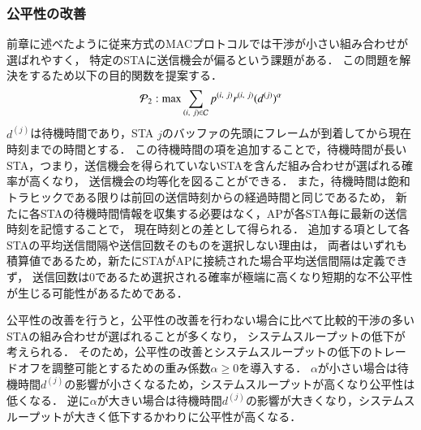 \documentclass[master]{kuisthesis}		%
\begin{document}
		\subsubsection{公平性の改善}\label{sec:fair}
			前章に述べたように従来方式のMACプロトコルでは干渉が小さい組み合わせが選ばれやすく，
			特定のSTAに送信機会が偏るという課題がある．
			この問題を解決をするため以下の目的関数を提案する．
			\begin{equation}
				{\mathcal P}_2: {\rm max} \sum_{(i,\ j)\in{\mathcal C}} p^{(i,\ j)}r^{(i,\ j)}(d^{(j)})^{\alpha} 	\label{eq:p2}
			\end{equation}
			$d^{(j)}$は待機時間であり，STA $j$のバッファの先頭にフレームが到着してから現在時刻までの時間とする．
			この待機時間の項を追加することで，待機時間が長いSTA，つまり，送信機会を得られていないSTAを含んだ組み合わせが選ばれる確率が高くなり，
			送信機会の均等化を図ることができる．
			また，待機時間は飽和トラヒックである限りは前回の送信時刻からの経過時間と同じであるため，
			新たに各STAの待機時間情報を収集する必要はなく，APが各STA毎に最新の送信時刻を記憶することで，
			現在時刻との差として得られる．
			追加する項として各STAの平均送信間隔や送信回数そのものを選択しない理由は，
			両者はいずれも積算値であるため，新たにSTAがAPに接続された場合平均送信間隔は定義できず，
			送信回数は0であるため選択される確率が極端に高くなり短期的な不公平性が生じる可能性があるためである．
			\par
			公平性の改善を行うと，公平性の改善を行わない場合に比べて比較的干渉の多いSTAの組み合わせが選ばれることが多くなり，
			システムスループットの低下が考えられる．
			そのため，公平性の改善とシステムスループットの低下のトレードオフを調整可能とするための重み係数$\alpha\geq 0$を導入する．
			$\alpha$が小さい場合は待機時間$d^{(j)}$の影響が小さくなるため，システムスループットが高くなり公平性は低くなる．
			逆に$\alpha$が大きい場合は待機時間$d^{(j)}$の影響が大きくなり，システムスループットが大きく低下するかわりに公平性が高くなる．
\end{document}

